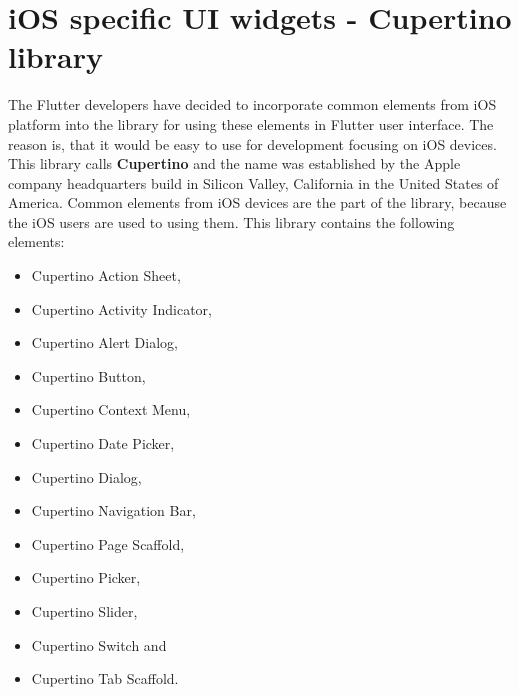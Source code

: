 \section{iOS specific UI widgets - Cupertino library}\label{sec:ios-specific-ui-widgets}
The Flutter developers have decided to incorporate common elements from iOS platform into the library for using these elements in Flutter user interface.
The reason is, that it would be easy to use for development focusing on iOS devices.
This library calls \textbf{Cupertino} and the name was established by the Apple company headquarters build in Silicon Valley, California in the United States of America.
Common elements from iOS devices are the part of the library, because the iOS users are used to using them.
This library contains the following elements:
\begin{itemize}
    \item Cupertino Action Sheet,
    \item Cupertino Activity Indicator,
    \item Cupertino Alert Dialog,
    \item Cupertino Button,
    \item Cupertino Context Menu,
    \item Cupertino Date Picker,
    \item Cupertino Dialog,
    \item Cupertino Navigation Bar,
    \item Cupertino Page Scaffold,
    \item Cupertino Picker,
    \item Cupertino Slider,
    \item Cupertino Switch and
    \item Cupertino Tab Scaffold.\cite{cupertino}
\end{itemize}
